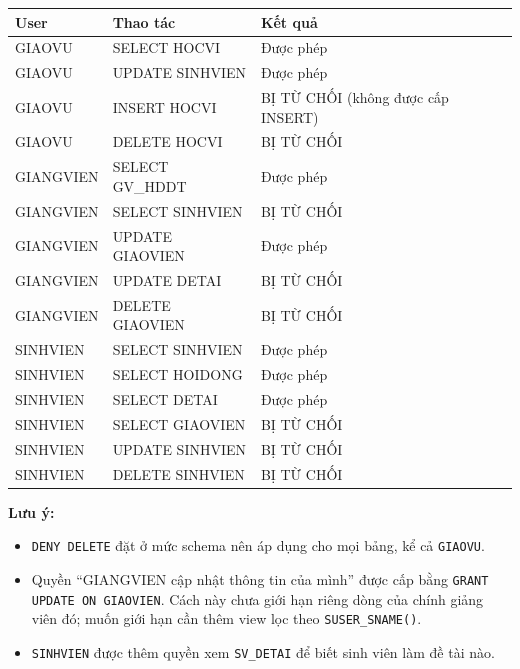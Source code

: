 \documentclass[12pt,a4paper]{article}
\begin{document}
\medskip
\begin{center}
\begin{tabular}{@{}lll@{}}
\toprule
\textbf{User} & \textbf{Thao tác} & \textbf{Kết quả}\\
\midrule
GIAOVU & SELECT HOCVI & Được phép\\
GIAOVU & UPDATE SINHVIEN & Được phép\\
GIAOVU & INSERT HOCVI & BỊ TỪ CHỐI (không được cấp INSERT)\\
GIAOVU & DELETE HOCVI & BỊ TỪ CHỐI\\
\midrule
GIANGVIEN & SELECT GV\_HDDT & Được phép\\
GIANGVIEN & SELECT SINHVIEN & BỊ TỪ CHỐI\\
GIANGVIEN & UPDATE GIAOVIEN & Được phép\\
GIANGVIEN & UPDATE DETAI & BỊ TỪ CHỐI\\
GIANGVIEN & DELETE GIAOVIEN & BỊ TỪ CHỐI\\
\midrule
SINHVIEN & SELECT SINHVIEN & Được phép\\
SINHVIEN & SELECT HOIDONG & Được phép\\
SINHVIEN & SELECT DETAI & Được phép\\
SINHVIEN & SELECT GIAOVIEN & BỊ TỪ CHỐI\\
SINHVIEN & UPDATE SINHVIEN & BỊ TỪ CHỐI\\
SINHVIEN & DELETE SINHVIEN & BỊ TỪ CHỐI\\
\bottomrule
\end{tabular}
\end{center}

\noindent\textbf{Lưu ý:}
\begin{itemize}
\item \texttt{DENY DELETE} đặt ở mức schema nên áp dụng cho mọi bảng, kể cả \texttt{GIAOVU}.
\item Quyền ``GIANGVIEN cập nhật thông tin của mình'' được cấp bằng \texttt{GRANT UPDATE ON GIAOVIEN}. Cách này chưa giới hạn riêng dòng của chính giảng viên đó; muốn giới hạn cần thêm view lọc theo \texttt{SUSER\_SNAME()}.
\item \texttt{SINHVIEN} được thêm quyền xem \texttt{SV\_DETAI} để biết sinh viên làm đề tài nào.
\end{itemize}
\end{document}

